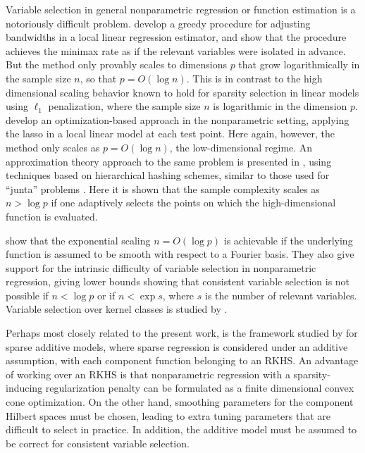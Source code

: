 Variable selection in general nonparametric regression or function
estimation is a notoriously difficult problem. \citet{lafferty2008rodeo} develop a greedy procedure for
adjusting bandwidths in a local linear regression estimator,
and show that the procedure achieves the minimax rate
as if the relevant variables were isolated in advance.
But the method only provably scales to dimensions $p$ that 
grow logarithmically in the sample size $n$, so that $p = O(\log n)$.  This
is in contrast to the high dimensional scaling behavior
known to hold for sparsity selection in linear models
using $\ell_1$ penalization, where the sample size $n$
is logarithmic in the dimension $p$. \citet{bertin:08}
develop an optimization-based approach in
the nonparametric setting, applying the lasso
in a local linear model at each test point.  Here again,
however, the method only scales as $p = O(\log n)$,
the low-dimensional regime.
An approximation theory approach to the same
problem is presented in \cite{devore:11}, 
using techniques based on hierarchical hashing schemes,
similar to those used for ``junta'' problems \citep{mossel:04}.
Here it is shown that the sample complexity scales as $n > \log p$ 
if one adaptively selects the points on
which the high-dimensional function is evaluated.

\citet{dalalyan:12} show that the exponential scaling $n=O(\log p)$ is
achievable if the underlying function is assumed to be smooth with
respect to a Fourier basis. They also give support for the intrinsic
difficulty of variable selection in nonparametric regression, giving
lower bounds showing that consistent variable selection is not
possible if $n < \log p$ or if $n < \exp s$, where $s$ is the number
of relevant variables.  Variable selection over kernel classes is
studied by \citet{Kolch:10}.

Perhaps most closely related to the present work, is the framework
studied by \cite{Raskutti:12} for sparse additive models, where sparse
regression is considered under an additive assumption, with each
component function belonging to an RKHS.  An advantage of working over
an RKHS is that nonparametric regression with a sparsity-inducing
regularization penalty can be formulated as a finite dimensional
convex cone optimization.  On the other hand, smoothing parameters for
the component Hilbert spaces must be chosen, leading to extra tuning
parameters that are difficult to select in practice.  In addition, the
additive model must be assumed to be correct for consistent variable
selection.

